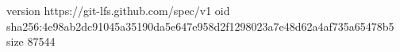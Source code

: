 version https://git-lfs.github.com/spec/v1
oid sha256:4e98ab2dc91045a35190da5e647e958d2f1298023a7e48d62a4af735a65478b5
size 87544
